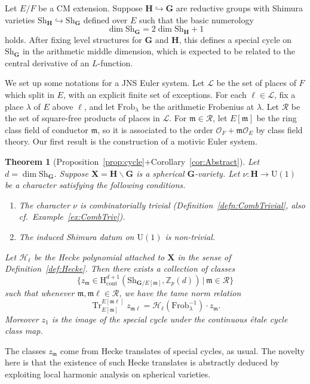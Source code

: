 \documentclass{amsart}
\newtheorem{theorem}{Theorem}[section]
\theoremstyle{definition}
\theoremstyle{remark}
\newcommand{\1}{\mathbf{1}}
\newcommand{\cont}{\mathrm{cont}}
\newcommand{\h}{\mathrm{H}}
\newcommand{\m}{\mathfrak{m}}
\newcommand{\mb}[1]{\mathbf{#1}}
\newcommand{\Or}{\mathcal{O}}
\newcommand{\sh}[1]{\mathcal{#1}}
\newcommand{\U}{\mathrm{U}}
\newcommand{\Z}{\mathbb{Z}}
\DeclareMathOperator{\Tr}{Tr}
\theoremstyle{definition}
\newcommand{\bG}{\mathbf{G}}
\newcommand{\Sh}{\mathrm{Sh}}
\begin{document}
Let $E/F$ be a CM extension. Suppose $\mb{H}\hookrightarrow\mb{G}$ are reductive groups with Shimura varieties $\Sh_{\mb{H}}\hookrightarrow\Sh_{\bG}$ defined over $E$ such that the basic numerology
\[
    \dim\Sh_\bG=2\dim\Sh_{\mb H}+1
\]
holds. After fixing level structures for $\mb{G}$ and $\mb{H}$, this defines a special cycle on $\Sh_\bG$ in the arithmetic middle dimension, which is expected to be related to the central derivative of an $L$-function.

We set up some notations for a JNS Euler system. Let $\mathscr{L}$ be the set of places of $F$ which split in $E$, with an explicit finite set of exceptions. For each $\ell\in\mathscr{L}$, fix a place $\lambda$ of $E$ above $\ell$, and let $\mathrm{Frob}_\lambda$ be the arithmetic Frobenius at $\lambda$. Let $\mathscr{R}$ be the set of square-free products of places in $\mathscr{L}$. For $\m\in\mathscr{R}$, let $E[\m]$ be the ring class field of conductor $\m$, so it is associated to the order $\Or_F+\m\Or_E$ by class field theory. Our first result is the construction of a motivic Euler system.

\begin{theorem}[Proposition~\ref{prop:cycle}+Corollary~\ref{cor:Abstract}]\label{thm:1}
    Let $d=\dim\Sh_{\mb G}$. Suppose $\mb{X}=\mb{H}\backslash\mb{G}$ is a spherical $\mb{G}$-variety. Let $\nu:\mb{H}\to\U(1)$ be a character satisfying the following conditions.
    \begin{enumerate}
        \item The character $\nu$ is combinatorially trivial (Definition~\ref{defn:CombTrivial}, also cf.~Example~\ref{ex:CombTriv}).
        \item The induced Shimura datum on $\U(1)$ is non-trivial.
    \end{enumerate}
    Let $\sh{H}_\ell$ be the Hecke polynomial attached to $\mb{X}$ in the sense of Definition~\ref{def:Hecke}. Then there exists a collection of classes
    \[
        \big\{z_\m\in\h^{d+1}_\cont(\Sh_{\bG/E[\m]},\Z_p(d))\,\big|\,\m\in\mathscr{R}\big\}
    \]
    such that whenever $\m,\m\ell\in\mathscr{R}$, we have the tame norm relation
    \[
        \Tr_{E[\m]}^{E[\m\ell]}z_{\m\ell}=\sh{H}_{\ell}(\mathrm{Frob}_\lambda^{-1})\cdot z_\m.
    \]
    Moreover $z_1$ is the image of the special cycle under the continuous \'etale cycle class map.
\end{theorem}

The classes $z_\m$ come from Hecke translates of special cycles, as usual. The novelty here is that the existence of such Hecke translates is abstractly deduced by exploiting local harmonic analysis on spherical varieties.
\end{document}
